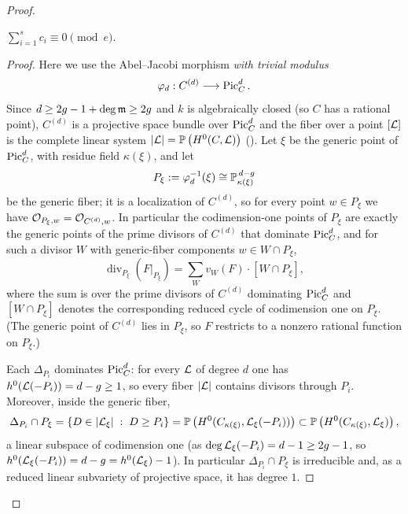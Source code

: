 \begin{proof}
    \begin{claim}\label{claim:coefficients_sum_to_zero}
        $\sum_{i=1}^{s} c_i \equiv 0 \pmod{e}$.
    \end{claim}
    \begin{proof}
        Here we use the Abel--Jacobi morphism \emph{with trivial modulus}
        \[ \varphi_d : C^{(d)} \longrightarrow \PicC[d]. \]
        Since $d \geq 2g - 1 + \deg\mdls \geq 2g$ and $k$ is algebraically closed (so $C$ has a rational
        point), $C^{(d)}$ is a projective space bundle over $\PicC[d]$ and the fiber over a point
        $[\cL]$ is the complete linear system $|\cL| = \bP\left(H^0(C, \cL)\right)$
        ().
        Let $\xi$ be the generic point of $\PicC[d]$, with residue field $\kappa(\xi)$, and let
        \[ P_\xi := \varphi_d^{-1}(\xi) \cong \bP^{\,d-g}_{\kappa(\xi)} \]
        be the generic fiber; it is a localization of $C^{(d)}$, so for every point
        $w \in P_\xi$ we have $\Oo_{P_\xi, w} = \Oo_{C^{(d)}, w}$. In particular the codimension-one
        points of $P_\xi$ are exactly the generic points of the prime divisors of $C^{(d)}$ that
        dominate $\PicC[d]$, and for such a divisor $W$ with generic-fiber components
        $w \in W \cap P_\xi$,
        \begin{equation}\label{equation:restriction_to_generic_fiber}
            \operatorname{div}_{P_\xi}\left( F|_{P_\xi} \right)
            = \sum_{W} v_W(F) \cdot \left[ W \cap P_\xi \right],
        \end{equation}
        where the sum is over the prime divisors of $C^{(d)}$ dominating $\PicC[d]$ and
        $[W \cap P_\xi]$ denotes the corresponding reduced cycle of codimension one on $P_\xi$.
        (The generic point of $C^{(d)}$ lies in $P_\xi$, so $F$ restricts to a nonzero rational function
        on $P_\xi$.)

        Each $\Delta_{P_i}$ dominates $\PicC[d]$: for every $\cL$ of degree $d$ one has
        $h^0(\cL(-P_i)) = d - g \geq 1$, so every fiber $|\cL|$ contains divisors through $P_i$.
        Moreover, inside the generic fiber,
        \[ \Delta_{P_i} \cap P_\xi = \left\{ D \in |\cL_\xi| \; : \; D \geq P_i \right\}
           = \bP\left( H^0(C_{\kappa(\xi)}, \cL_\xi(-P_i)) \right)
           \subset \bP\left( H^0(C_{\kappa(\xi)}, \cL_\xi) \right), \]
        a linear subspace of codimension one (as $\deg \cL_\xi(-P_i) = d - 1 \geq 2g - 1$, so
        $h^0(\cL_\xi(-P_i)) = d - g = h^0(\cL_\xi) - 1$). In particular $\Delta_{P_i} \cap P_\xi$ is
        irreducible and, as a reduced linear subvariety of projective space, it has degree $1$.


\end{proof}
\end{proof}
